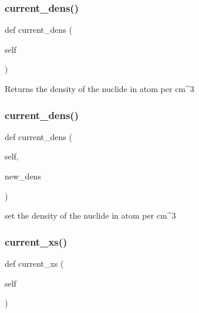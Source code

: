 \subsubsection{\texorpdfstring{current\+\_\+dens()}{current\_dens()}\hspace{0.1cm}{\footnotesize\ttfamily [1/2]}}
{\footnotesize\ttfamily def current\+\_\+dens (\begin{DoxyParamCaption}\item[{}]{self }\end{DoxyParamCaption})}

\begin{DoxyVerb}Returns the density of the nuclide in atom per cm^3\end{DoxyVerb}
 \mbox{\label{classopenbu_1_1passport_1_1_passport_a2e640e060087e64c0e938f17b6c3653e}} 
\subsubsection{\texorpdfstring{current\+\_\+dens()}{current\_dens()}\hspace{0.1cm}{\footnotesize\ttfamily [2/2]}}
{\footnotesize\ttfamily def current\+\_\+dens (\begin{DoxyParamCaption}\item[{}]{self,  }\item[{}]{new\+\_\+dens }\end{DoxyParamCaption})}

\begin{DoxyVerb}set the density of the nuclide in atom per cm^3\end{DoxyVerb}
 \mbox{\label{classopenbu_1_1passport_1_1_passport_a555c209d9b1ea0fcc30cb14a259342f4}} 
\subsubsection{\texorpdfstring{current\+\_\+xs()}{current\_xs()}}
{\footnotesize\ttfamily def current\+\_\+xs (\begin{DoxyParamCaption}\item[{}]{self }\end{DoxyParamCaption})}


